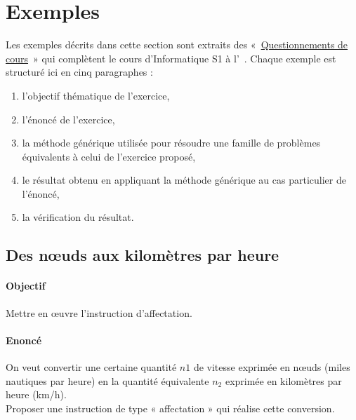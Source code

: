 \documentclass[11pt,a4paper,colorlinks,breaklinks]{article}
\begin{document}
\section{Exemples}\label{sec:exemples}

Les exemples décrits dans cette section sont extraits des 
«~\href{http://www.enib.fr/~tisseau/pdf/course/q-info-S1.pdf}{Questionnements de cours}~»
qui complètent le cours d'Informatique S1 à l'\enib\ \cite{questions}.
Chaque exemple est structuré ici en cinq paragraphes : 
\begin{enumerate}
\item l'objectif thématique de l'exercice,
\item l'énoncé de l'exercice,
\item la méthode générique utilisée pour résoudre une famille de problèmes 
	équivalents à celui de l'exercice proposé, 
\item le résultat obtenu en appliquant la méthode générique au cas particulier de l'énoncé,
\item la vérification du résultat.
\end{enumerate}

\subsection{Des n\oe uds aux kilomètres par heure}\label{subsec:noeuds}
\paragraph{Objectif} Mettre en \oe uvre l'instruction d'affectation.

\paragraph{Enoncé}
On veut convertir une certaine quantité $n1$ de vitesse exprimée en n\oe uds 
(miles nautiques par heure) en la quantité équivalente $n_2$ exprimée en 
kilomètres par heure (km/h).\\
Proposer une instruction de type « affectation » qui réalise cette conversion.
\end{document}
